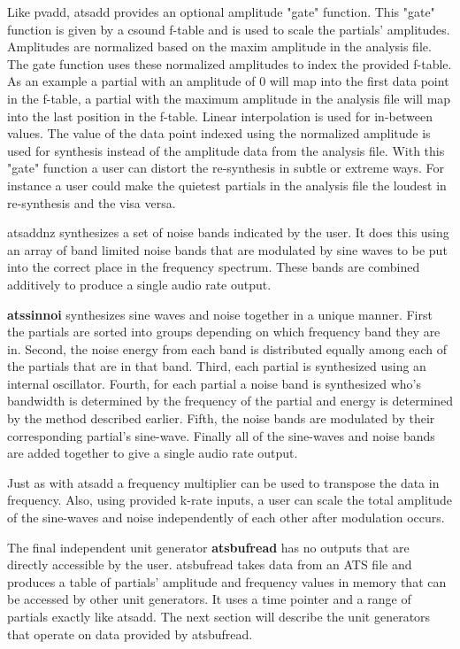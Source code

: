 \documentclass[10pt,letterpaper]{article}
\begin{document}
Like pvadd, atsadd provides an optional amplitude "gate" function.  This "gate" function is given by a csound f-table and is used to scale the partials' amplitudes.  Amplitudes are normalized based on the maxim amplitude in the analysis file.  The gate function uses these normalized amplitudes to index the provided f-table.  As an example a partial with an amplitude of 0 will map into the first data point in the f-table, a partial with the maximum amplitude in the analysis file will map into the last position in the f-table.  Linear interpolation is used for in-between values.  The value of the data point indexed using the normalized amplitude is used for synthesis instead of the amplitude data from the analysis file.  With this "gate" function a user can distort the re-synthesis in subtle or extreme ways.  For instance a user could make the quietest partials in the analysis file the loudest in re-synthesis and the visa versa.

atsaddnz synthesizes a set of noise bands indicated by the user.  It does this using an array of band limited noise bands that are modulated by sine waves to be put into the correct place in the frequency spectrum.  These bands are combined additively to produce a single audio rate output.

\textbf{atssinnoi} synthesizes sine waves and noise together in a unique manner.  First the partials are sorted into groups depending on which frequency band they are in.  Second, the noise energy from each band is distributed equally among each of the partials that are in that band.  Third, each partial is synthesized using an internal oscillator.  Fourth, for each partial a noise band is synthesized who's bandwidth is determined by the frequency of the partial and energy is determined by the method described earlier.  Fifth, the noise bands are modulated by their corresponding partial's sine-wave.  Finally all of the sine-waves and noise bands are added together to give a single audio rate output.

Just as with atsadd a frequency multiplier can be used to transpose the data in frequency.  Also, using provided k-rate inputs, a user can scale the total amplitude of the sine-waves and noise independently of each other after modulation occurs.

The final independent unit generator \textbf{atsbufread} has no outputs that are directly accessible by the user.  atsbufread takes data from an ATS file and produces a table of partials' amplitude and frequency values in memory that can be accessed by other unit generators.  It uses a time pointer and a range of partials exactly like atsadd.  The next section will describe the unit generators that operate on data provided by atsbufread.
\end{document}
